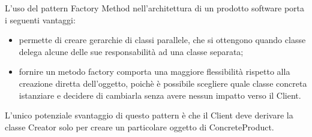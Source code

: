 		L'uso del pattern Factory Method nell'architettura di un prodotto software porta i seguenti vantaggi:
		\begin{itemize}
			\item permette di creare gerarchie di classi parallele, che si ottengono quando classe delega alcune delle sue responsabilità ad una classe separata;
			\item fornire un metodo factory comporta una maggiore flessibilità rispetto alla creazione diretta dell'oggetto, poichè è possibile scegliere quale classe concreta istanziare e decidere di cambiarla senza avere nessun impatto verso il Client.
		\end{itemize}
		L'unico potenziale svantaggio di questo pattern è che il Client deve derivare la classe Creator solo per creare un particolare oggetto di ConcreteProduct.